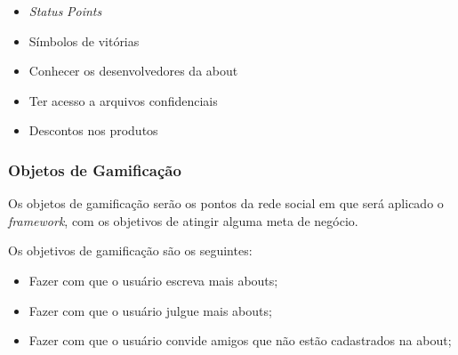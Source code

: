 \begin{itemize}
    \item \textit{Status} \textit{Points}
    \item Símbolos de vitórias
    \item Conhecer os desenvolvedores da about
    \item Ter acesso a arquivos confidenciais
    \item Descontos nos produtos
\end{itemize}

\subsubsection{Objetos de Gamificação}
\label{sec:objetodegamificacao}
Os objetos de gamificação serão os pontos da rede social em que será aplicado o \textit{framework},
com os objetivos de atingir alguma meta de negócio.

Os objetivos de gamificação são os seguintes:

\begin{itemize}
    \item Fazer com que o usuário escreva mais abouts;
    \item Fazer com que o usuário julgue mais abouts;
    \item Fazer com que o usuário convide amigos que não estão cadastrados na about;
\end{itemize}

